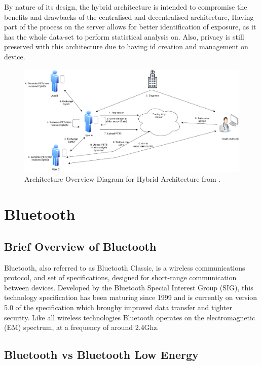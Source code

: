 \documentclass{l4proj}
\begin{document}
By nature of its design, the hybrid architecture is intended to compromise the benefits and drawbacks of the centralised and decentralised architecture, Having part of the process on the server allows for better identification of exposure, as it has the whole data-set to perform statistical analysis on. Also, privacy is still preserved with this architecture due to having id creation and management on device.

\begin{figure}[!htb]
    \centering
    \includegraphics[width=0.8\linewidth]{images/ahmed_hybrid.png}

    \caption{ Architecture Overview Diagram for Hybrid Architecture from \citet{ahmed_survey_2020}.
    }

    \label{fig:hybrid_arch}
\end{figure}

\section{Bluetooth}

\subsection{Brief Overview of Bluetooth}

Bluetooth, also referred to as Bluetooth Classic, is a wireless communications protocol, and set of specifications, designed for short-range communication between devices. Developed by the Bluetooth Special Interest Group (SIG), this technology specification has been maturing since 1999 and is currently on version 5.0 of the specification which broughy improved data transfer and tighter security. Like all wireless technologies Bluetooth operates on the electromagnetic (EM) spectrum, at a frequency of around 2.4Ghz.

\subsection{Bluetooth vs Bluetooth Low Energy}
\end{document}
